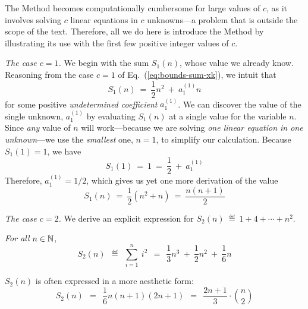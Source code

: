 The Method becomes computationally cumbersome for large values of $c$, as it involves solving $c$ linear equations in $c$ unknowns---a problem that is outside the scope of the text.  Therefore, all we do here is introduce the Method by illustrating its use with the first few positive integer values of $c$.

\medskip

{\it The case $c=1$.}
%
We begin with the sum $S_1(n)$, whose value we already know.  Reasoning from the case $c=1$ of Eq.~(\ref{eq:bounds-sum-xk}), we intuit that
\[ S_1(n) \ = \ \frac{1}{2} n^2 \ + \ a^{(1)}_1 n \]
for some positive {\it undetermined coefficient} $a^{(1)}_1$.  We can discover the value of the single unknown, $a^{(1)}_1$ by evaluating $S_1(n)$ at a single value for the variable $n$.  Since {\em any} value of $n$ will work---because we are solving {\em one linear equation in one unknown}---we use the {\em smallest} one, $n=1$, to simplify our calculation.  Because $S_1(1) = 1$, we have
\[ S_1(1) \ = \ 1 \ = \ \frac{1}{2} \ + \ a^{(1)}_1 \]
Therefore, $a^{(1)}_1 = 1/2$, which gives us yet one more derivation of the value
\[ S_1(n) \ = \ \frac{1}{2} \left( n^2 + n \right) \ = \  \frac{n(n+1)}{2} \]

\medskip

{\it The case $c=2$.}
%
We derive an explicit expression for $S_2(n) \ \eqdef \  1 + 4 + \cdots + n^2$.

\begin{prop}
\label{thm:summing-squares}
{\em For all} $n \in \mathbb{N}$,
\begin{equation}
\label{eq:sum-1-to-nsq}
S_2(n) \ \ \eqdef \ \ \sum_{i=1}^n \ i^2 
\ \ = \ \ \frac{1}{3} n^3 \ + \ \frac{1}{2} n^2 \ + \ \frac{1}{6} n
\end{equation}
\end{prop}

\noindent
$S_2(n)$ is often expressed in a more aesthetic form:
\[ S_2(n) \ \ = \ \
\frac{1}{6} n (n+1)(2n+1) \ \  = \ \
\frac{2n+1}{3} \cdot {n \choose 2}
\]


